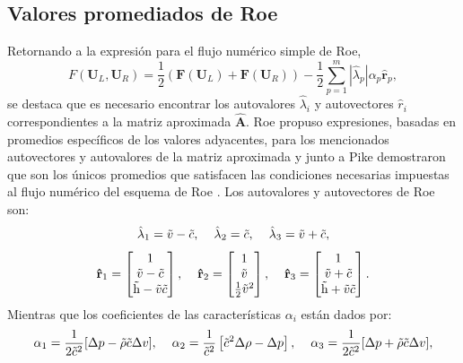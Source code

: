\subsection{Valores promediados de Roe}
Retornando a la expresión para el flujo numérico simple de Roe,
\begin{equation}
	F(\mathbf{U}_L, \mathbf{U}_R) = \frac{1}{2}\left(\mathbf{F}(\mathbf{U}_L) +\mathbf{F}(\mathbf{U}_R)\right) - 
	\frac{1}{2}\sum_{p=1}^{m}|\hat{\lambda}_{p}|\alpha_{p}\mathbf{\hat{r}}_{p},
	\label{eq:roe-flux-2}
\end{equation}
se destaca que es necesario encontrar los autovalores $\hat{\lambda}_i$ y autovectores $\hat{r}_i$ correspondientes a la matriz aproximada $\mathbf{\hat{A}}$. Roe \cite{roe81} propuso expresiones, basadas en promedios específicos de los valores adyacentes, para los mencionados autovectores y autovalores de la matriz aproximada y junto a Pike demostraron que son los únicos promedios que satisfacen las condiciones necesarias impuestas al flujo numérico del esquema de Roe \cite{roe86}. Los autovalores y autovectores de Roe son:
\begin{equation}
	\hat{\lambda}_1 = \tilde{v}-\tilde{c}, \hspace{4mm}
	\hat{\lambda}_2 = \tilde{c}, \hspace{4mm}
	\hat{\lambda}_3 = \tilde{v}+\tilde{c},
\end{equation}
\begin{equation}
	\mathbf{\hat{r}}_1 = 
	\begin{bmatrix}
		1 \\
		\tilde{v}-\tilde{c} \\
		\tilde{\mathrm{h}}-\tilde{v}\tilde{c}
	\end{bmatrix},\hspace{4mm}
	\mathbf{\hat{r}}_2 = 
	\begin{bmatrix}
		1 \\
		\tilde{v} \\
		\frac{1}{2}\tilde{v}^{2}
	\end{bmatrix},\hspace{4mm}
	\mathbf{\hat{r}}_3 = 
	\begin{bmatrix}
		1 \\
		\tilde{v}+\tilde{c} \\
		\tilde{\mathrm{h}}+\tilde{v}\tilde{c}
	\end{bmatrix}.
\end{equation}
 Mientras que los coeficientes de las características $\alpha_{i}$ están dados por:
 \begin{equation}
 	\alpha_1 = \frac{1}{2\tilde{c}^{2}}[\Delta p - \tilde{\rho}\tilde{c}\Delta v], \hspace{4mm}
 	\alpha_2 = \frac{1}{\tilde{c}^{2}}\left[\tilde{c}^{2}\Delta\rho - \Delta p\right], \hspace{4mm}
 	\alpha_3 = \frac{1}{2\tilde{c}^{2}}[\Delta p + \tilde{\rho}\tilde{c}\Delta v],
 \end{equation}
